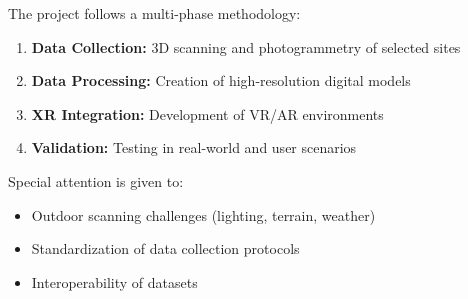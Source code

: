 \noindent
The project follows a multi-phase methodology:

\begin{enumerate}
    \item \textbf{Data Collection:} 3D scanning and photogrammetry of selected sites
    \item \textbf{Data Processing:} Creation of high-resolution digital models
    \item \textbf{XR Integration:} Development of VR/AR environments
    \item \textbf{Validation:} Testing in real-world and user scenarios
\end{enumerate}

Special attention is given to:
\begin{itemize}
    \item Outdoor scanning challenges (lighting, terrain, weather)
    \item Standardization of data collection protocols
    \item Interoperability of datasets
\end{itemize}